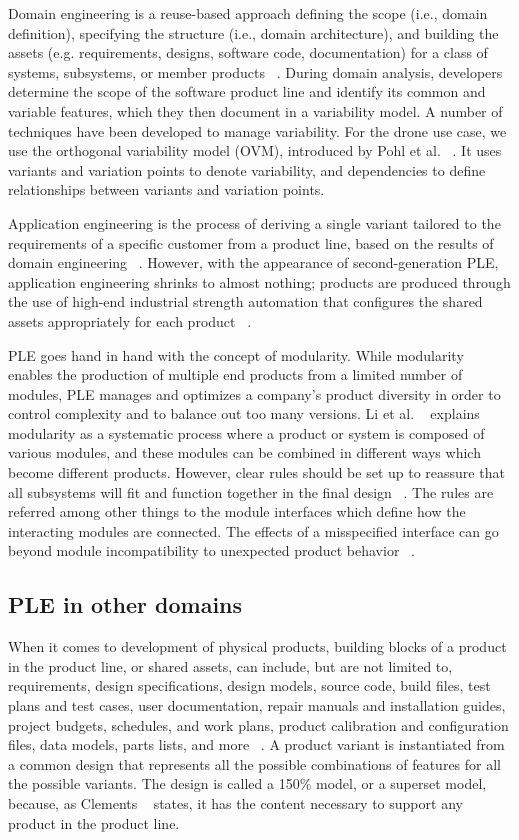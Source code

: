 \documentclass[sigconf,review]{acmart}
\begin{document}
Domain engineering is a reuse-based approach defining the scope (i.e., domain definition), specifying the structure (i.e., domain architecture), and building the assets (e.g. requirements, designs, software code, documentation) for a class of systems, subsystems, or member products ~\cite{ISO/IEC_26550}. During domain analysis, developers determine the scope of the software product line and identify its common and variable features, which they then document in a variability model. 
A number of techniques have been developed to manage variability.
For the drone use case, we use the orthogonal variability model (OVM), introduced by Pohl et al. ~\cite{Pohl_2005}. It uses variants and variation points to denote variability, and dependencies to define relationships between variants and variation points.

Application engineering is the process of deriving a single variant tailored to the requirements of a specific customer from a product line, based on the results of domain engineering ~\cite{Kästner_2013}. 
However, with the appearance of second-generation PLE, application engineering shrinks to almost nothing; products are produced through the use of high-end industrial strength automation that configures the shared assets appropriately for each product ~\cite{Krueger_2013}.

PLE goes hand in hand with the concept of modularity. While modularity enables the production of multiple end products from a limited number of modules, PLE manages and optimizes a company's product diversity in order to control complexity and to balance out too many versions.
Li et al. ~\cite{Li_2019} explains modularity as a systematic process where a product or system is composed of various modules, and these modules can be combined in different ways which become different products. However, clear rules should be set up to reassure that all subsystems will fit and function together in the final design ~\cite{Baldwin_2003}. The rules are referred among other things to the module interfaces which define how the interacting modules are connected. The effects of a misspecified interface can go beyond
module incompatibility to unexpected product behavior ~\cite{Parslov_2015}. 

\subsection{PLE in other domains}
\label{sec:ple-other}

When it comes to development of physical products, building blocks of a product in the product line, or shared assets, can include, but are not limited to, requirements, design specifications, design models, source code, build files, test plans and test cases, user documentation, repair manuals and installation guides, project budgets, schedules, and work plans, product calibration and configuration files, data models, parts lists, and more ~\cite{Clements_2015}. 
A product variant is instantiated from a common design that represents all the possible combinations of features for all the possible variants. The design is called a 150\% model, or a superset model, because, as Clements ~\cite{Clements_2015} states, it has the content necessary to support any product in the product line. 
\end{document}
